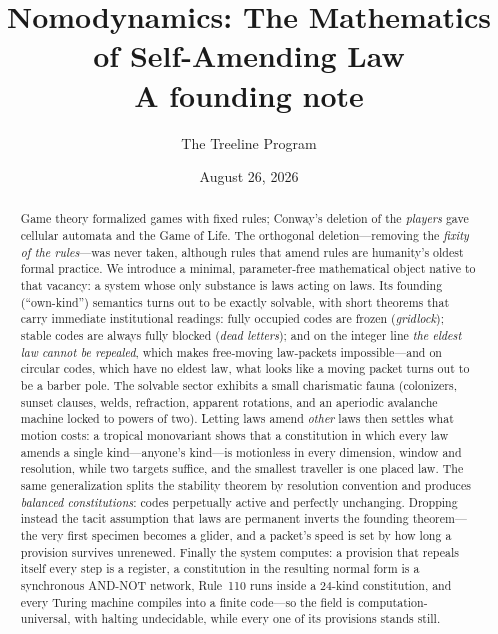 \documentclass[10pt]{article}
\title{\bfseries Nomodynamics: The Mathematics of Self-Amending Law\\
\large A founding note}
\author{The Treeline Program}
\date{August 26, 2026}
\theoremstyle{definition}
\theoremstyle{remark}
\begin{document}
\maketitle
\vspace{-2em}
\begin{abstract}
\noindent Game theory formalized games with fixed rules; Conway's deletion of the
\emph{players} gave cellular automata and the Game of Life. The orthogonal
deletion---removing the \emph{fixity of the rules}---was never taken, although
rules that amend rules are humanity's oldest formal practice. We introduce a
minimal, parameter-free mathematical object native to that vacancy: a system
whose only substance is laws acting on laws. Its founding (``own-kind'')
semantics turns out to be exactly solvable, with short theorems that carry
immediate institutional readings: fully occupied codes are frozen
(\emph{gridlock}); stable codes are always fully blocked (\emph{dead letters});
and on the integer line \emph{the eldest law cannot be repealed}, which makes
free-moving law-packets impossible---and on circular codes, which have no eldest
law, what looks like a moving packet turns out to be a barber pole. The solvable sector exhibits a small
charismatic fauna (colonizers, sunset clauses, welds, refraction, apparent
rotations, and an aperiodic avalanche machine locked to powers of two). Letting
laws amend \emph{other} laws then settles what motion costs: a tropical
monovariant shows that a constitution in which every law amends a single
kind---anyone's kind---is motionless in every dimension, window and resolution,
while two targets suffice, and the smallest traveller is one placed law. The
same generalization splits the stability theorem by resolution convention and
produces \emph{balanced constitutions}: codes perpetually active and perfectly
unchanging. Dropping instead the tacit assumption that laws are permanent
inverts the founding theorem---the very first specimen becomes a glider, and a
packet's speed is set by how long a provision survives unrenewed. Finally the
system computes: a provision that repeals itself every step is a register, a
constitution in the resulting normal form is a synchronous AND-NOT network,
Rule~110 runs inside a $24$-kind constitution, and every Turing machine compiles
into a finite code---so the field is computation-universal, with halting
undecidable, while every one of its provisions stands still.
\end{abstract}
\end{document}
